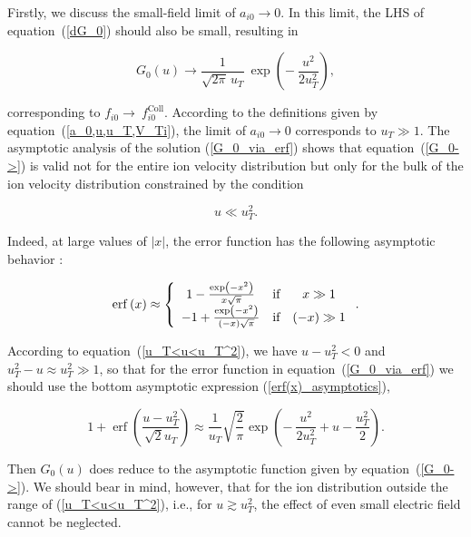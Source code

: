 \documentclass[draft]{agujournal2019}
\begin{document}
{Firstly, we discuss the small-field limit of $a_{i0}\rightarrow0$. In this
limit, the LHS of equation~(\ref{dG_0}) should also be small, resulting in
\begin{linenomath*}
\begin{equation}
G_{0}(u)\rightarrow\frac{1}{\sqrt{2\pi}\,u_{T}}\ \exp\left(  -\ \frac{u^{2}%
}{2u_{T}^{2}}\right)  , 
\label{G_0->}
\end{equation}
\end{linenomath*}
corresponding to $f_{i0}\rightarrow\ f_{i0}^{\mathrm{Coll}}$. According to the
definitions given by equation~(\ref{a_0,u,u_T,V_Ti}), the limit of
$a_{i0}\rightarrow0$ corresponds to $u_{T}\gg1$. The asymptotic analysis of
the solution (\ref{G_0_via_erf}) shows that equation~(\ref{G_0->}) is valid
not for the entire ion velocity distribution but only for the bulk of the ion
velocity distribution constrained by the condition
\begin{linenomath*}
\begin{equation}
u\ll u_{T}^{2}. 
\label{u_T<u<u_T^2}
\end{equation}
\end{linenomath*}
Indeed, at large values of $|x|$, the error function has the following
asymptotic behavior \cite{Abramowitz:Handbook88}:
\begin{linenomath*}
\begin{equation}
\operatorname{erf}\left(  x\right)  \approx\left\{
\begin{array}
[c]{ccc}%
1-\frac{\exp\left(  -x^{2}\right)  }{x\sqrt{\pi}} & \text{if} & x\gg1\\
-1+\frac{\exp\left(  -x^{2}\right)  }{\left(  -x\right)  \sqrt{\pi}} &
\text{if} & \left(  -x\right)  \gg1
\end{array}
\right.  . 
\label{erf(x)_asymptotics}
\end{equation}
\end{linenomath*}
According to equation~(\ref{u_T<u<u_T^2}), we have $u-u_{T}^{2}<0$ and
$u_{T}^{2}-u\approx u_{T}^{2}\gg1$, so that for the error function in
equation~(\ref{G_0_via_erf}) we should use the bottom asymptotic expression
(\ref{erf(x)_asymptotics}),
\begin{linenomath*}
\[
1+\operatorname{erf}\left(  \frac{u-u_{T}^{2}}{\sqrt{2}u_{T}}\right)
\approx\frac{1}{u_{T}}\sqrt{\frac{2}{\pi}}\exp\left(  -\ \frac{u^{2}}%
{2u_{T}^{2}}+u-\frac{u_{T}^{2}}{2}\right).
\]
\end{linenomath*}
Then $G_{0}(u)$ does reduce to the asymptotic function given by
equation~(\ref{G_0->}). We should bear in mind, however, that for the ion
distribution outside the range of (\ref{u_T<u<u_T^2}), i.e., for $u\gtrsim
u_{T}^{2}$, the effect of even small electric field cannot be neglected.

}
\end{document}
